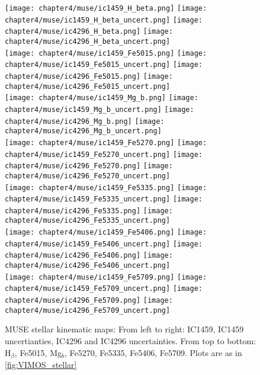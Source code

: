 \begin{figure*}
	\centering
	\texttt{[image: chapter4/muse/ic1459\_H\_beta.png]}
	\texttt{[image: chapter4/muse/ic1459\_H\_beta\_uncert.png]}
	\texttt{[image: chapter4/muse/ic4296\_H\_beta.png]}
	\texttt{[image: chapter4/muse/ic4296\_H\_beta\_uncert.png]}
	\\
	\texttt{[image: chapter4/muse/ic1459\_Fe5015.png]}
	\texttt{[image: chapter4/muse/ic1459\_Fe5015\_uncert.png]}
	\texttt{[image: chapter4/muse/ic4296\_Fe5015.png]}
	\texttt{[image: chapter4/muse/ic4296\_Fe5015\_uncert.png]}
	\\
	\texttt{[image: chapter4/muse/ic1459\_Mg\_b.png]}
	\texttt{[image: chapter4/muse/ic1459\_Mg\_b\_uncert.png]}
	\texttt{[image: chapter4/muse/ic4296\_Mg\_b.png]}
	\texttt{[image: chapter4/muse/ic4296\_Mg\_b\_uncert.png]}
	\\
	\texttt{[image: chapter4/muse/ic1459\_Fe5270.png]}
	\texttt{[image: chapter4/muse/ic1459\_Fe5270\_uncert.png]}
	\texttt{[image: chapter4/muse/ic4296\_Fe5270.png]}
	\texttt{[image: chapter4/muse/ic4296\_Fe5270\_uncert.png]}
	\\
	\texttt{[image: chapter4/muse/ic1459\_Fe5335.png]}
	\texttt{[image: chapter4/muse/ic1459\_Fe5335\_uncert.png]}
	\texttt{[image: chapter4/muse/ic4296\_Fe5335.png]}
	\texttt{[image: chapter4/muse/ic4296\_Fe5335\_uncert.png]}
	\\
	\texttt{[image: chapter4/muse/ic1459\_Fe5406.png]}
	\texttt{[image: chapter4/muse/ic1459\_Fe5406\_uncert.png]}
	\texttt{[image: chapter4/muse/ic4296\_Fe5406.png]}
	\texttt{[image: chapter4/muse/ic4296\_Fe5406\_uncert.png]}
	\\
	\texttt{[image: chapter4/muse/ic1459\_Fe5709.png]}
	\texttt{[image: chapter4/muse/ic1459\_Fe5709\_uncert.png]}
	\texttt{[image: chapter4/muse/ic4296\_Fe5709.png]}
	\texttt{[image: chapter4/muse/ic4296\_Fe5709\_uncert.png]}
	\\
	\caption[MUSE absorption line strength maps]{MUSE stellar kinematic maps: From left to right: IC1459, IC1459 uncertianties, IC4296 and IC4296 uncertainties. From top to bottom: H$_\beta$, Fe5015, Mg$_b$, Fe5270, Fe5335, Fe5406, Fe5709. Plots are as in \ref{fig:VIMOS_stellar}}
	\label{fig:MUSE_absorption}
\end{figure*}

